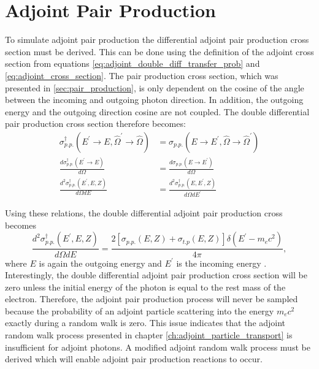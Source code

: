 \section{Adjoint Pair Production}
To simulate adjoint pair production the differential adjoint pair production 
cross section must be derived. This can be done using the definition of the
adjoint cross section from equations \ref{eq:adjoint_double_diff_transfer_prob} 
and \ref{eq:adjoint_cross_section}. The pair production cross section, which
was presented in \ref{sec:pair_production}, is only dependent on the cosine
of the angle between the incoming and outgoing photon direction. In addition,
the outgoing energy and the outgoing direction cosine are not coupled. The
double differential pair production cross section therefore becomes:
\begin{align}
  \sigma_{p.p.}^{\dagger}(E^{'} \to E, \hat{\Omega}^{'} \to \hat{\Omega}) & = 
  \sigma_{p.p.}(E \to E^{'}, \hat{\Omega} \to \hat{\Omega}^{'}) \nonumber \\
  \frac{d\sigma_{p.p.}^{\dagger}(E^{'} \to E)}{d\Omega} & = 
  \frac{d\sigma_{p.p.}(E \to E^{'})}{d\Omega} \nonumber \\
  \frac{d^2\sigma_{p.p.}^{\dagger}(E^{'},E,Z)}{d\Omega dE} & = 
  \frac{d^2\sigma_{p.p.}^{\dagger}(E,E^{'},Z)}{d\Omega dE^{'}}
\end{align}

Using these relations, the double differential adjoint pair production cross 
becomes
\begin{equation}
  \frac{d^2\sigma_{p.p.}^{\dagger}(E^{'},E,Z)}{d\Omega dE} = 
  \frac{2\left[\sigma_{p.p.}(E,Z)+\sigma_{t.p}(E,Z)\right]\delta(E^{'}-m_ec^2)}
  {4\pi},
\end{equation}
where $E$ is again the outgoing energy and $E^{'}$ is the incoming energy
\citep{hoogenboom_adjoint_2000}.
Interestingly, the double differential adjoint pair production cross section
will be zero unless the initial energy of the photon is equal to the rest mass 
of the electron. Therefore, the adjoint pair production process will never be
sampled because the probability of an adjoint particle scattering into the
energy $m_ec^2$ exactly during a random walk is zero. This issue indicates that
the adjoint random walk process presented in chapter 
\ref{ch:adjoint_particle_transport} is insufficient for adjoint photons. A 
modified adjoint random walk process must be derived which will enable adjoint 
pair production reactions to occur. 

